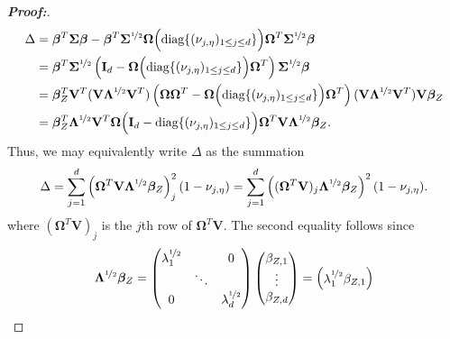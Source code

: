 \documentclass[11pt,twoside]{article}
\theoremstyle{definition}
\theoremstyle{remark}
\begin{document}
\begin{proof}[\textbf{Proof:}]
\begin{align*}
    \Delta &= \bm{\beta}^T \mathbf{\Sigma} \bm{\beta} - \bm{\beta}^T \mathbf{\Sigma}^{\nicefrac{1}{2}} \mathbf{\Omega} \Big( \text{diag}\{(\nu_{j, \eta})_{1 \leq j \leq d} \} \Big) \mathbf{\Omega}^T \mathbf{\Sigma}^{\nicefrac{1}{2}} \bm{\beta} \\
    &= \bm{\beta}^T \mathbf{\Sigma}^{\nicefrac{1}{2}} \left(\mathbf{I}_d - \mathbf{\Omega} \Big( \text{diag}\{(\nu_{j, \eta})_{1 \leq j \leq d} \} \Big) \mathbf{\Omega}^T  \right) \mathbf{\Sigma}^{\nicefrac{1}{2}} \bm{\beta} \\
    &= \bm{\beta}^T_Z \mathbf{V}^T ( \mathbf{V} \mathbf{\Lambda}^{\nicefrac{1}{2}} \mathbf{V}^T) \left(\mathbf{\Omega} \mathbf{\Omega}^T - \mathbf{\Omega} \Big( \text{diag}\{(\nu_{j, \eta})_{1 \leq j \leq d} \} \Big) \mathbf{\Omega}^T  \right) ( \mathbf{V} \mathbf{\Lambda}^{\nicefrac{1}{2}} \mathbf{V}^T) \mathbf{V} \bm{\beta}_Z \\
    &= \bm{\beta}^T_Z  \mathbf{\Lambda}^{\nicefrac{1}{2}} \mathbf{V}^T\mathbf{\Omega} \Big( \mathbf{I}_d  - \text{diag}\{(\nu_{j, \eta})_{1 \leq j \leq d} \} 
 \Big)\mathbf{\Omega}^T   \mathbf{V} \mathbf{\Lambda}^{\nicefrac{1}{2}}  \bm{\beta}_Z.
\end{align*}
Thus, we may equivalently write $\Delta$ as the summation
\begin{align*}
    \Delta = \sum^d_{j=1} \left(\mathbf{\Omega}^T   \mathbf{V} \mathbf{\Lambda}^{\nicefrac{1}{2}}  \bm{\beta}_Z \right)^2_j (1 - \nu_{j, \eta}) = \sum^d_{j=1} \left((\mathbf{\Omega}^T   \mathbf{V})_j \mathbf{\Lambda}^{\nicefrac{1}{2}}  \bm{\beta}_Z \right)^2 (1 - \nu_{j, \eta}).
\end{align*}
where $(\mathbf{\Omega}^T   \mathbf{V})_j$ is the $j$th row of $\mathbf{\Omega}^T \mathbf{V}$. The second equality follows since
\begin{align*}
    \mathbf{\Lambda}^{\nicefrac{1}{2}}  \bm{\beta}_Z = \begin{pmatrix}
        \lambda^{\nicefrac{1}{2}}_1 & & 0\\
        & \ddots & \\
        0 & & \lambda^{\nicefrac{1}{2}}_d
    \end{pmatrix} \begin{pmatrix}
        \beta_{Z, 1} \\
        \vdots \\
        \beta_{Z, d}
    \end{pmatrix} = \begin{pmatrix}
        \lambda^{\nicefrac{1}{2}}_1 \beta_{Z, 1} \\

\end{pmatrix}
\end{align*}
\end{proof}
\end{document}
